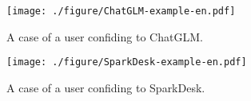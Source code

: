 \documentclass[11pt]{article}
\begin{document}
\begin{figure*}[ht]
  \centering
  \texttt{[image: ./figure/ChatGLM-example-en.pdf]}
  \caption{A case of a user confiding to ChatGLM.
}
  \label{ChatGLM_Example}
\end{figure*}

\begin{figure*}[ht]
  \centering
  \texttt{[image: ./figure/SparkDesk-example-en.pdf]}
  \caption{A case of a user confiding to SparkDesk.
}
  \label{SparkDesk_Example}
\end{figure*}
\end{document}
